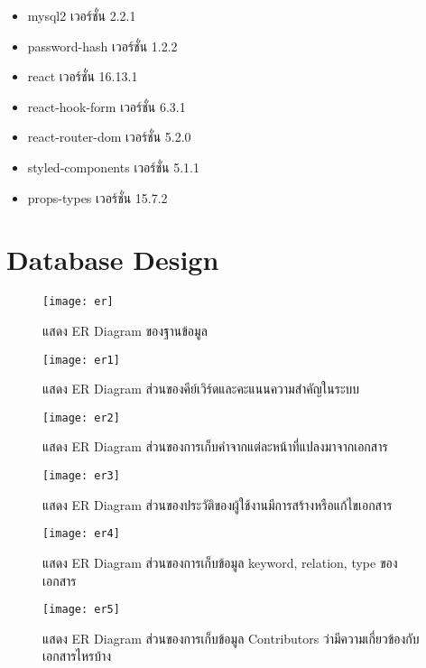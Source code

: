 \begin{enumerate}
\begin{itemize}
		        \item mysql2 เวอร์ชั่น 2.2.1
		        \item password-hash เวอร์ชั่น 1.2.2
		        \item react เวอร์ชั่น 16.13.1
		        \item react-hook-form เวอร์ชั่น 6.3.1
		        \item react-router-dom เวอร์ชั่น 5.2.0
		        \item styled-components เวอร์ชั่น 5.1.1
		        \item props-types เวอร์ชั่น 15.7.2
            \end{itemize}
        \end{enumerate}
		
\section{Database Design}

\begin{figure}[H]
    \centering
    \texttt{[image: er]}
    \caption{แสดง ER Diagram ของฐานข้อมูล}\label{fig:er}
\end{figure}

\begin{figure}[H]
    \centering
    \texttt{[image: er1]}
    \caption{แสดง ER Diagram ส่วนของคีย์เวิร์ดและคะแนนความสำคัญในระบบ}\label{fig:er1}
\end{figure}


\begin{figure}[H]
    \centering
    \texttt{[image: er2]}
    \caption{แสดง ER Diagram ส่วนของการเก็บคำจากแต่ละหน้าที่แปลงมาจากเอกสาร}\label{fig:er2}
\end{figure}


\begin{figure}[H]
    \centering
    \texttt{[image: er3]}
    \caption{แสดง ER Diagram ส่วนของประวัติของผู้ใช้งานมีการสร้างหรือแก้ไขเอกสาร}\label{fig:er3}
\end{figure}



\begin{figure}[H]
    \centering
    \texttt{[image: er4]}
    \caption{แสดง ER Diagram ส่วนของการเก็บข้อมูล keyword, relation, type ของเอกสาร}\label{fig:er4}
\end{figure}

\begin{figure}[H]
    \centering
    \texttt{[image: er5]}
    \caption{แสดง ER Diagram ส่วนของการเก็บข้อมูล Contributors ว่ามีความเกี่ยวข้องกับเอกสารไหรบ้าง}\label{fig:er5}
\end{figure}

